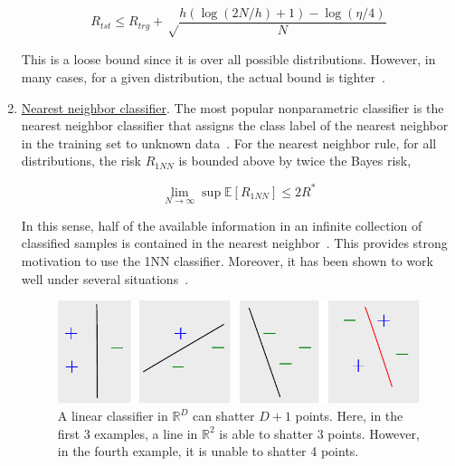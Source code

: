 \begin{enumerate}
\begin{equation}
R_{tst} \leq R_{trg} + \sqrt\frac{h(\log (2N/h)+1) - \log (\eta/4)}{N}
\end{equation}

This is a loose bound since it is over all possible distributions.  However, in many cases, for a given distribution, the actual bound is tighter~\cite{Videolectures.net}.

\item \underline{Nearest neighbor classifier}.  The most popular nonparametric classifier is the nearest neighbor classifier that assigns the class label of the nearest neighbor in the training set to unknown data~\cite{2003_JNL_PRML_Karacali}.  For the nearest neighbor rule, for all distributions, the risk $R_{1NN}$ is bounded above by twice the Bayes risk,

\begin{equation}
\lim\limits_{N \rightarrow \infty} \sup\mathbb{E}\left[R_{1NN}\right] \leq 2R^*  
\end{equation}

In this sense, half of the available information in an infinite collection of classified samples is contained in the nearest neighbor~\cite{1967_JNL_PRML_Cover}.  This provides strong motivation to use the 1NN classifier.  Moreover, it has been shown to work well under several situations~\cite{1996_BOOK_PR_DevroyeGyorfiLugosi}.

								\begin{figure}[t]
								\centering
								\includegraphics[width=1.0\textwidth]{thesis2/theory_PRML_shattering.pdf}
								\caption{A linear classifier in $\mathbb{R}^D$ can shatter $D+1$ points.  Here, in the first 3 examples, a line in $\mathbb{R}^2$ is able to shatter 3 points.  However, in the fourth example, it is unable to shatter 4 points.}
								\label{fig:shattering}
								\end{figure}


\end{enumerate}
